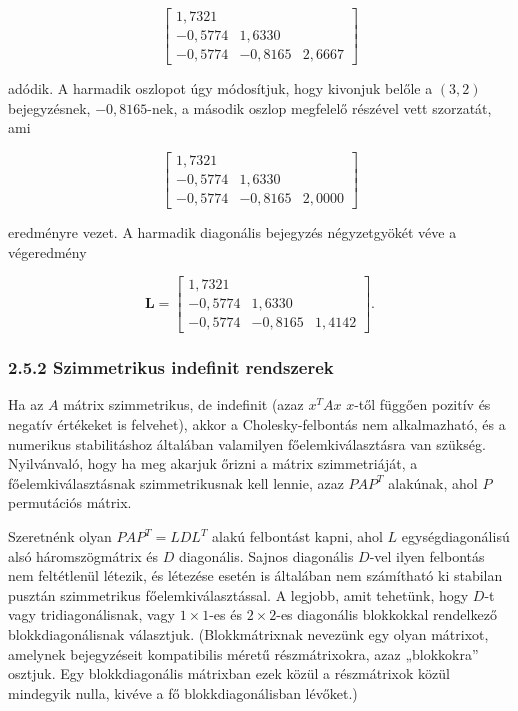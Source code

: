 \documentclass[
  magyar,
  11pt]{article}
\begin{document}
\[\begin{bmatrix} 1{,}7321 \\ -0{,}5774 & 1{,}6330 \\ -0{,}5774 & -0{,}8165 & 2{,}6667 \end{bmatrix}\]

adódik. A harmadik oszlopot úgy módosítjuk, hogy kivonjuk belőle a
\((3, 2)\) bejegyzésnek, \(-0{,}8165\)-nek, a második oszlop megfelelő
részével vett szorzatát, ami

\[\begin{bmatrix} 1{,}7321 \\ -0{,}5774 & 1{,}6330 \\ -0{,}5774 & -0{,}8165 & 2{,}0000 \end{bmatrix}\]

eredményre vezet. A harmadik diagonális bejegyzés négyzetgyökét véve a
végeredmény

\[\mathbf{L} = \begin{bmatrix} 1{,}7321 \\ -0{,}5774 & 1{,}6330 \\ -0{,}5774 & -0{,}8165 & 1{,}4142 \end{bmatrix}.\]

\subsubsection{2.5.2 Szimmetrikus indefinit
rendszerek}\label{szimmetrikus-indefinit-rendszerek}

Ha az \(A\) mátrix szimmetrikus, de indefinit (azaz \(x^T A x\)
\(x\)-től függően pozitív és negatív értékeket is felvehet), akkor a
Cholesky-felbontás nem alkalmazható, és a numerikus stabilitáshoz
általában valamilyen főelemkiválasztásra van szükség. Nyilvánvaló, hogy
ha meg akarjuk őrizni a mátrix szimmetriáját, a főelemkiválasztásnak
szimmetrikusnak kell lennie, azaz \(P A P^T\) alakúnak, ahol \(P\)
permutációs mátrix.

Szeretnénk olyan \(P A P^T = L D L^T\) alakú felbontást kapni, ahol
\(L\) egységdiagonálisú alsó háromszögmátrix és \(D\) diagonális. Sajnos
diagonális \(D\)-vel ilyen felbontás nem feltétlenül létezik, és
létezése esetén is általában nem számítható ki stabilan pusztán
szimmetrikus főelemkiválasztással. A legjobb, amit tehetünk, hogy
\(D\)-t vagy tridiagonálisnak, vagy \(1 \times 1\)-es és
\(2 \times 2\)-es diagonális blokkokkal rendelkező blokkdiagonálisnak
választjuk. (Blokkmátrixnak nevezünk egy olyan mátrixot, amelynek
bejegyzéseit kompatibilis méretű részmátrixokra, azaz „blokkokra''
osztjuk. Egy blokkdiagonális mátrixban ezek közül a részmátrixok közül
mindegyik nulla, kivéve a fő blokkdiagonálisban lévőket.)
\end{document}
